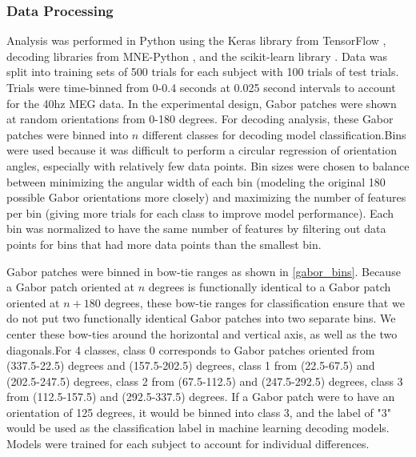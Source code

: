 \documentclass[../main.tex]{subfiles}
\begin{document}
\subsubsection{Data Processing}
Analysis was performed in Python using the Keras \citep{chollet2015keras} library from TensorFlow \citep{tensorflow2015-whitepaper}, decoding libraries from MNE-Python \citep{mne}, and the scikit-learn library \citep{scikit-learn}. Data was split into training sets of 500 trials for each subject with 100 trials of test trials. Trials were time-binned from 0-0.4 seconds at 0.025 second intervals to account for the 40hz MEG data. In the experimental design, Gabor patches were shown at random orientations from 0-180 degrees. For decoding analysis, these Gabor patches were binned into $n$ different classes for decoding model classification.Bins were used because it was difficult to perform a circular regression of orientation angles, especially with relatively few data points. Bin sizes were chosen to balance between minimizing the angular width of each bin (modeling the original 180 possible Gabor orientations more closely) and maximizing the number of features per bin (giving more trials for each class to improve model performance). Each bin was normalized to have the same number of features by filtering out data points for bins that had more data points than the smallest bin.

Gabor patches were binned in bow-tie ranges as shown in \ref{gabor_bins}. Because a Gabor patch oriented at $n$ degrees is functionally identical to a Gabor patch oriented at $n + 180$ degrees, these bow-tie ranges for classification ensure that we do not put two functionally identical Gabor patches into two separate bins. We center these bow-ties around the horizontal and vertical axis, as well as the two diagonals.For 4 classes, class 0 corresponds to Gabor patches oriented from (337.5-22.5) degrees and (157.5-202.5) degrees, class 1 from (22.5-67.5) and (202.5-247.5) degrees, class 2 from (67.5-112.5) and (247.5-292.5) degrees, class 3 from (112.5-157.5) and (292.5-337.5) degrees. If a Gabor patch were to have an orientation of 125 degrees, it would be binned into class 3, and the label of "3" would be used as the classification label in machine learning decoding models. Models were trained for each subject to account for individual differences. 
\end{document}
